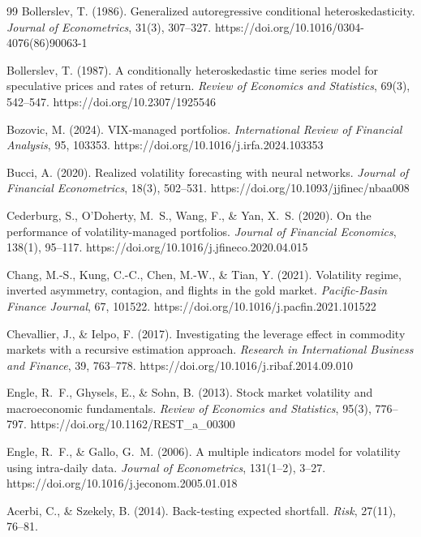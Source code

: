\documentclass[12pt,a4paper]{article}
\begin{document}
\begin{thebibliography}{99}
Bollerslev, T. (1986). Generalized autoregressive conditional heteroskedasticity. \textit{Journal of Econometrics}, 31(3), 307--327. https://doi.org/10.1016/0304-4076(86)90063-1

Bollerslev, T. (1987). A conditionally heteroskedastic time series model for speculative prices and rates of return. \textit{Review of Economics and Statistics}, 69(3), 542--547. https://doi.org/10.2307/1925546

Bozovic, M. (2024). VIX-managed portfolios. \textit{International Review of Financial Analysis}, 95, 103353. https://doi.org/10.1016/j.irfa.2024.103353

Bucci, A. (2020). Realized volatility forecasting with neural networks. \textit{Journal of Financial Econometrics}, 18(3), 502--531. https://doi.org/10.1093/jjfinec/nbaa008

Cederburg, S., O'Doherty, M.~S., Wang, F., \& Yan, X.~S. (2020). On the performance of volatility-managed portfolios. \textit{Journal of Financial Economics}, 138(1), 95--117. https://doi.org/10.1016/j.jfineco.2020.04.015

Chang, M.-S., Kung, C.-C., Chen, M.-W., \& Tian, Y. (2021). Volatility regime, inverted asymmetry, contagion, and flights in the gold market. \textit{Pacific-Basin Finance Journal}, 67, 101522. https://doi.org/10.1016/j.pacfin.2021.101522

Chevallier, J., \& Ielpo, F. (2017). Investigating the leverage effect in commodity markets with a recursive estimation approach. \textit{Research in International Business and Finance}, 39, 763--778. https://doi.org/10.1016/j.ribaf.2014.09.010

Engle, R.~F., Ghysels, E., \& Sohn, B. (2013). Stock market volatility and macroeconomic fundamentals. \textit{Review of Economics and Statistics}, 95(3), 776--797. https://doi.org/10.1162/REST\_a\_00300

Engle, R.~F., \& Gallo, G.~M. (2006). A multiple indicators model for volatility using intra-daily data. \textit{Journal of Econometrics}, 131(1--2), 3--27. https://doi.org/10.1016/j.jeconom.2005.01.018

Acerbi, C., \& Szekely, B. (2014). Back-testing expected shortfall. \textit{Risk}, 27(11), 76--81.


\end{thebibliography}
\end{document}
